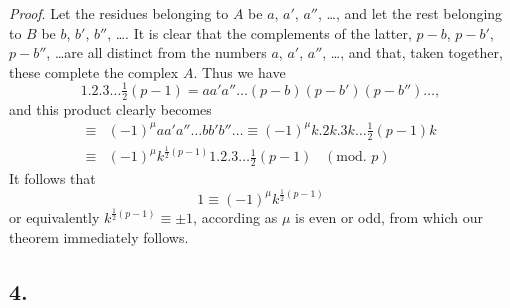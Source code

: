 \documentclass[14pt]{memoir}
\theoremstyle{plain}
\theoremstyle{remark}
\begin{document}
\textit{Proof}. Let the residues belonging to $A$ be $a$, $a'$, $a''$, \dots, and let the rest belonging to $B$ be $b$, $b'$, $b''$, \dots.  It is clear that the complements of the latter, $p-b$, $p-b'$, $p-b''$, \dots are all distinct from the numbers $a$, $a'$, $a''$, \dots, and that, taken together, these complete the complex $A$.  Thus we have 
\[ 1.2.3\dots\tfrac{1}{2}(p-1) = a a' a'' \dots (p-b)(p-b')(p-b'') \dots, \]
and this product clearly becomes
\begin{align*} \equiv& (-1)^{\mu} aa'a''\dots b b' b'' \dots \equiv (-1)^\mu k . 2k .3k\dots \tfrac{1}{2}(p-1)k \\
\equiv& (-1)^\mu k^{\frac{1}{2}(p-1)} 1 . 2 . 3 \dots \tfrac{1}{2}(p-1) \; \;\;(\textrm{mod. }p)  \end{align*}
It follows that 
\[ 1 \equiv (-1)^{\mu} k^{\frac{1}{2}(p-1)} \]
or equivalently $k^{\frac{1}{2}(p-1)} \equiv \pm 1$, according as $\mu$ is even or odd, from which our theorem immediately follows.

\subsection*{4.} 
\end{document}
